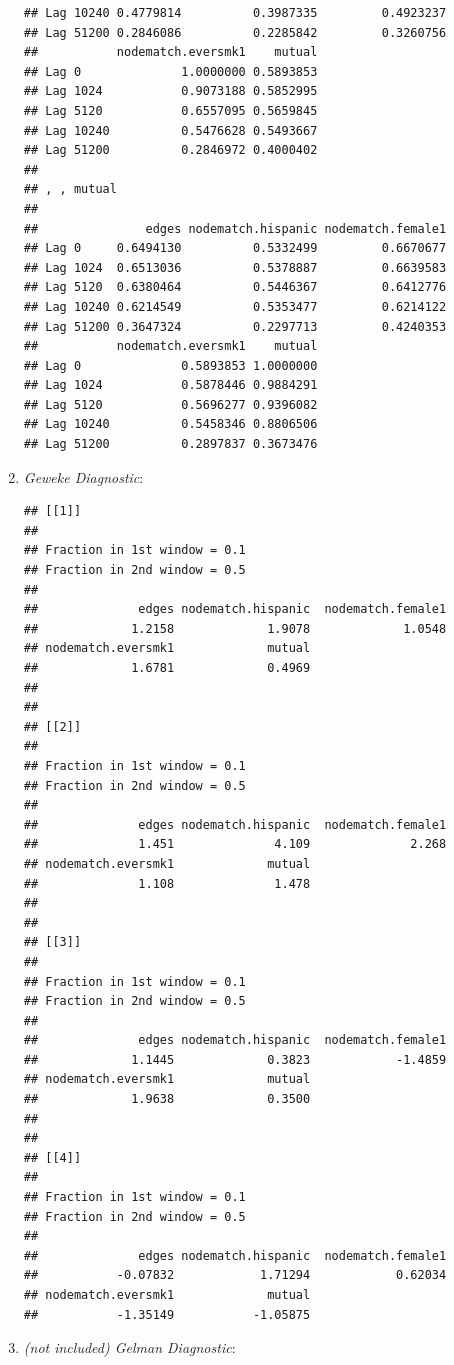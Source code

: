 \documentclass[]{book}
\newenvironment{Shaded}{\begin{snugshade}}{\end{snugshade}}
\newcommand{\KeywordTok}[1]{\textcolor[rgb]{0.13,0.29,0.53}{\textbf{#1}}}
\newcommand{\OperatorTok}[1]{\textcolor[rgb]{0.81,0.36,0.00}{\textbf{#1}}}
\newcommand{\NormalTok}[1]{#1}
\theoremstyle{definition}
\theoremstyle{definition}
\theoremstyle{definition}
\theoremstyle{remark}
\begin{document}
\begin{enumerate}
\begin{verbatim}
## Lag 10240 0.4779814          0.3987335         0.4923237
## Lag 51200 0.2846086          0.2285842         0.3260756
##           nodematch.eversmk1    mutual
## Lag 0              1.0000000 0.5893853
## Lag 1024           0.9073188 0.5852995
## Lag 5120           0.6557095 0.5659845
## Lag 10240          0.5476628 0.5493667
## Lag 51200          0.2846972 0.4000402
## 
## , , mutual
## 
##               edges nodematch.hispanic nodematch.female1
## Lag 0     0.6494130          0.5332499         0.6670677
## Lag 1024  0.6513036          0.5378887         0.6639583
## Lag 5120  0.6380464          0.5446367         0.6412776
## Lag 10240 0.6214549          0.5353477         0.6214122
## Lag 51200 0.3647324          0.2297713         0.4240353
##           nodematch.eversmk1    mutual
## Lag 0              0.5893853 1.0000000
## Lag 1024           0.5878446 0.9884291
## Lag 5120           0.5696277 0.9396082
## Lag 10240          0.5458346 0.8806506
## Lag 51200          0.2897837 0.3673476
\end{verbatim}
\item
  \emph{Geweke Diagnostic}:

\begin{Shaded}
\end{Shaded}

\begin{verbatim}
## [[1]]
## 
## Fraction in 1st window = 0.1
## Fraction in 2nd window = 0.5 
## 
##              edges nodematch.hispanic  nodematch.female1 
##             1.2158             1.9078             1.0548 
## nodematch.eversmk1             mutual 
##             1.6781             0.4969 
## 
## 
## [[2]]
## 
## Fraction in 1st window = 0.1
## Fraction in 2nd window = 0.5 
## 
##              edges nodematch.hispanic  nodematch.female1 
##              1.451              4.109              2.268 
## nodematch.eversmk1             mutual 
##              1.108              1.478 
## 
## 
## [[3]]
## 
## Fraction in 1st window = 0.1
## Fraction in 2nd window = 0.5 
## 
##              edges nodematch.hispanic  nodematch.female1 
##             1.1445             0.3823            -1.4859 
## nodematch.eversmk1             mutual 
##             1.9638             0.3500 
## 
## 
## [[4]]
## 
## Fraction in 1st window = 0.1
## Fraction in 2nd window = 0.5 
## 
##              edges nodematch.hispanic  nodematch.female1 
##           -0.07832            1.71294            0.62034 
## nodematch.eversmk1             mutual 
##           -1.35149           -1.05875
\end{verbatim}
\item
  \emph{(not included) Gelman Diagnostic}:


\end{enumerate}
\end{document}

